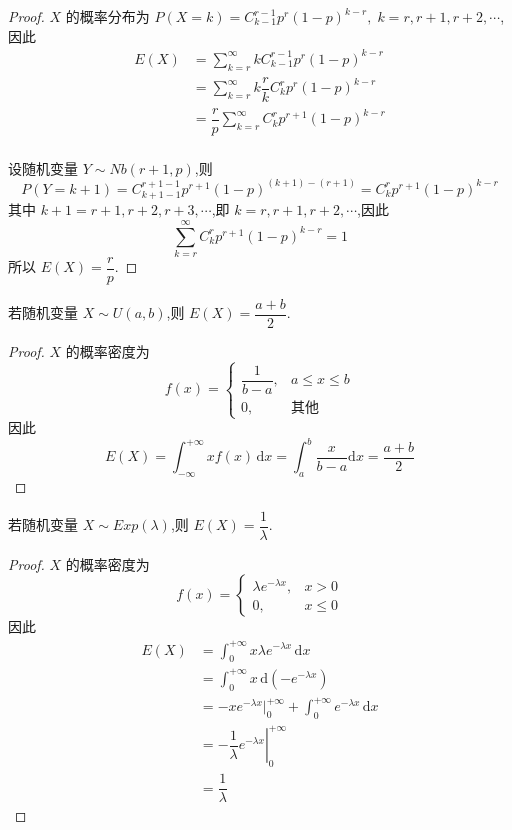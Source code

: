 \begin{proof}
    $X$ 的概率分布为 $P(X=k) = C_{k-1}^{r-1} p^r (1-p)^{k-r},\; k = r, r+1, r+2, \cdots$,因此
    $$
    \begin{aligned}
        E(X) &= \sum_{k=r}^{\infty} k C_{k-1}^{r-1} p^r (1-p)^{k-r} \\
        &= \sum_{k=r}^{\infty} k \dfrac{r}{k} C_{k}^{r} p^r (1-p)^{k-r} \\
        &= \dfrac{r}{p} \sum_{k=r}^{\infty} C_{k}^{r} p^{r+1} (1-p)^{k-r} \\
    \end{aligned}
    $$

    设随机变量 $Y \sim Nb(r+1, p)$,则
    $$
    P(Y=k+1) = C_{k+1-1}^{r+1-1} p^{r+1} (1-p)^{(k+1)-(r+1)} = C_{k}^{r} p^{r+1} (1-p)^{k-r}
    $$
    其中 $k+1 = r+1, r+2, r+3, \cdots$,即 $k = r, r+1, r+2, \cdots$,因此
    $$
    \sum_{k=r}^{\infty} C_{k}^{r} p^{r+1} (1-p)^{k-r} = 1
    $$
    所以 $E(X) = \dfrac{r}{p}$.
\end{proof}

\begin{conclusion}
    \indent 若随机变量 $X \sim U(a,b)$,则 $E(X) = \dfrac{a+b}{2}$.
\end{conclusion}

\begin{proof}
    $X$ 的概率密度为
    $$
    f(x) = \begin{cases}
        \dfrac{1}{b-a}, & a \leqslant x \leqslant b \\[0.5em]
        0, & \text{其他}
    \end{cases}
    $$
    因此
    $$
    E(X) = \int_{-\infty}^{+\infty} x f(x) \, \text{d}x = \int_a^b \dfrac{x}{b-a} \text{d}x = \dfrac{a+b}{2}
    $$
\end{proof}

\begin{conclusion}
    \indent 若随机变量 $X \sim Exp(\lambda)$,则 $E(X) = \dfrac{1}{\lambda}$.
\end{conclusion}

\begin{proof}
    $X$ 的概率密度为
    $$
    f(x) = \begin{cases}
        \lambda e^{-\lambda x}, & x>0 \\
        0, & x \leqslant 0
    \end{cases}
    $$
    因此
    $$
    \begin{aligned}
        E(X) &= \int_0^{+\infty} x \lambda e^{-\lambda x} \, \text{d}x \\
        &= \int_0^{+\infty} x \, \text{d} (-e^{-\lambda x}) \\
        &= -xe^{-\lambda x} \Big|_0^{+\infty} + \int_0^{+\infty} e^{-\lambda x} \, \text{d}x \\
        &= \left. -\dfrac{1}{\lambda} e^{-\lambda x} \right|_0^{+\infty} \\
        &= \dfrac{1}{\lambda}
    \end{aligned}
    $$
\end{proof}

